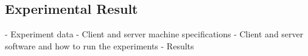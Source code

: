 \subsection{Experimental Result}\label{sec_experimental_result}
- Experiment data
- Client and server machine specifications
- Client and server software and how to run the experiments
- Results